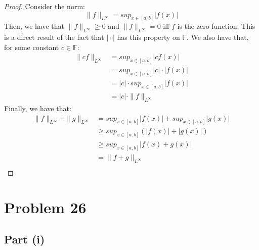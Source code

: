 \documentclass{article}
\begin{document}
\begin{proof}
Consider the norm:
$$\|f\|_{L^{\infty}} = sup_{x \in [a, b]}\lvert f(x) \rvert$$
Then, we have that $\|f\|_{L^{\infty}} \geq 0$ and $\|f\|_{L^{\infty}} = 0$ iff $f$ is the zero function. This is a direct result of the fact that $\mid \cdot \mid$ has this property on $\mathbb{F}$. We also have that, for some constant $c \in \mathbb{F}$:
\begin{align*}
\|cf\|_{L^{\infty}} &=  sup_{x \in [a, b]}\lvert cf(x) \rvert \\
&= sup_{x \in [a, b]}\lvert c \rvert \cdot \lvert f(x) \rvert \\
&= \lvert c \rvert \cdot sup_{x \in [a, b]}\lvert f(x) \rvert \\
&= \lvert c \rvert \cdot \|f\|_{L^{\infty}}
\end{align*}
Finally, we have that:
\begin{align*}
\|f\|_{L^{\infty}} + \|g\|_{L^{\infty}} &=  sup_{x \in [a, b]}\lvert f(x) \rvert + sup_{x \in [a, b]}\lvert g(x) \rvert \\
&\geq sup_{x \in [a, b]}(\lvert f(x) \rvert + \lvert g(x) \rvert) \\
&\geq sup_{x \in [a, b]}\lvert f(x) + g(x) \rvert \\
&= \|f + g\|_{L^{\infty}} \\
\end{align*}
\end{proof}


\section*{Problem 26}

\subsection*{Part (i)}
\end{document}
